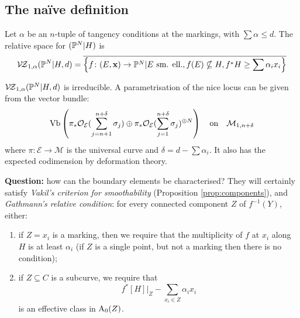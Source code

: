 \subsection{The na\"ive definition}
\begin{dfn}
 Let $\alpha$ be an $n$-tuple of tangency conditions at the markings, with $\sum\alpha\leq d$. The relative space for $(\mathbb P^N|H)$ is \[\mathcal{V\!Z}_{1,\alpha}(\mathbb P^N|H,d)=\overline{\left\{f\colon (E,\mathbf x)\rightarrow \mathbb P^N| E\text{ sm. ell.}, f(E)\nsubseteq H, f^*H\geq\sum\alpha_ix_i\right\}}\]
\end{dfn}
\begin{rmk}
 $\mathcal{V\!Z}_{1,\alpha}(\mathbb P^N|H,d)$ is irreducible. A parametrisation of the nice locus can be given from the vector bundle:
\[ \operatorname{Vb}\left(\pi_*\mathcal{O}_{\mathcal E}(\sum_{j=n+1}^{n+\delta}\sigma_j)\oplus\pi_*\mathcal{O}_{\mathcal E}(\sum_{j=1}^{n+\delta}\sigma_j)^{\oplus N}\right) \quad \text{on} \quad \mathcal{M}_{1,n+\delta}\]
where $\pi\colon\mathcal E\to\mathcal M$ is the universal curve and $\delta=d-\sum\alpha_i$. It also has the expected codimension by deformation theory.
\end{rmk}
\textbf{Question:} how can the boundary elements be characterised?
They will certainly satisfy \emph{Vakil's criterion for smoothability} (Proposition \ref{prop:components}), and \emph{Gathmann's relative condition}: for every connected component $Z$ of $f^{-1}(Y)$, either:
\begin{enumerate}
\item if $Z=x_i$ is a marking, then we require that the multiplicity of $f$ at $x_i$ along $H$ is at least $\alpha_i$ (if $Z$ is a single point, but not a marking then there is no condition);
\item if $Z \subseteq C$ is a subcurve, we require that
\begin{equation*} f^*[H]|_Z -\sum_{x_i\in Z}\alpha_ix_i\end{equation*}
is an effective class in $\operatorname{A}_0(Z)$.
\end{enumerate}
